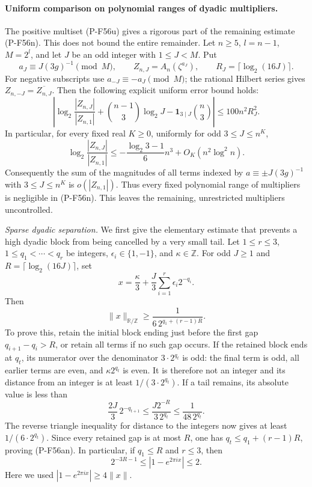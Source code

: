 \documentclass[11pt,a4paper]{article}
\begin{document}
\paragraph{Uniform comparison on polynomial ranges of dyadic multipliers.}
The positive multiset (P-F56u) gives a rigorous part of the
remaining estimate (P-F56n). This does not bound the entire
remainder. Let $n\ge5$, $l=n-1$, $M=2^l$, and let $J$ be an
odd integer with $1\le J<M$. Put
\[
 a_J\equiv J(3g)^{-1}\pmod M,\qquad
 Z_{n,J}=A_n(\zeta^{a_J}),\qquad
 R_J=\lceil\log_2(16J)\rceil.
 \tag{P-F56ak}
\]
For negative subscripts use $a_{-J}\equiv-a_J\pmod M$;
the rational Hilbert series gives
$Z_{n,-J}=\overline{Z_{n,J}}$.
Then the following explicit uniform error bound holds:
\[
 \left|\log_2\frac{|Z_{n,J}|}{|Z_{n,1}|}
       +\binom{n-1}{3}\log_2J
       -\mathbf1_{3\mid J}\binom n3\right|
       \le 100n^2R_J^2.
 \tag{P-F56al}
\]
In particular, for every fixed real $K\ge0$, uniformly for
odd $3\le J\le n^K$,
\[
 \log_2\frac{|Z_{n,J}|}{|Z_{n,1}|}
 \le -\frac{\log_2 3-1}{6}n^3
                         +O_K(n^2\log^2 n).
 \tag{P-F56am}
\]
Consequently the sum of the magnitudes of all terms indexed
by $a\equiv\pm J(3g)^{-1}$ with $3\le J\le n^K$ is
$o(|Z_{n,1}|)$. Thus every fixed polynomial range of
multipliers is negligible in (P-F56n). This leaves the
remaining, unrestricted multipliers uncontrolled.

\emph{Sparse dyadic separation.}
We first give the elementary estimate that prevents a high
dyadic block from being cancelled by a very small tail.
Let $1\le r\le3$, $1\le q_1<\cdots<q_r$ be integers,
$\epsilon_i\in\{1,-1\}$, and $\kappa\in\mathbb Z$.
For odd $J\ge1$ and $R=\lceil\log_2(16J)\rceil$, set
\[
 x=\frac\kappa3+
              \frac J3\sum_{i=1}^r\epsilon_i2^{-q_i}.
\]
Then
\[
 \|x\|_{\mathbb R/\mathbb Z}
       \ge\frac1{6\,2^{q_1+(r-1)R}}.
 \tag{P-F56an}
\]
To prove this, retain the initial block ending just before
the first gap $q_{i+1}-q_i>R$, or retain all terms if no
such gap occurs. If the retained block ends at $q_t$, its
numerator over the denominator $3\cdot2^{q_t}$ is odd:
the final term is odd, all earlier terms are even, and
$\kappa2^{q_t}$ is even. It is therefore not an integer
and its distance from an integer is at least
$1/(3\cdot2^{q_t})$.
If a tail remains, its absolute value is less than
\[
 \frac{2J}{3}\,2^{-q_{t+1}}
 \le\frac{J2^{-R}}{3\,2^{q_t}}
 \le\frac1{48\,2^{q_t}}.
\]
The reverse triangle inequality for distance to the
integers now gives at least $1/(6\cdot2^{q_t})$.
Since every retained gap is at most $R$, one has
$q_t\le q_1+(r-1)R$, proving (P-F56an).
In particular, if $q_1\le R$ and $r\le3$, then
\[
 2^{-3R-1}\le |1-e^{2\pi ix}|\le2.
 \tag{P-F56ao}
\]
Here we used $|1-e^{2\pi ix}|\ge4\|x\|$.
\end{document}
